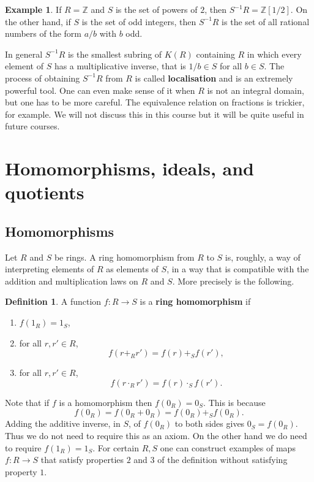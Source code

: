 \documentclass{article}
\newcommand{\Z}{\mathbb{Z}}
\newcommand{\rb}[1]{\left( #1 \right)}
\renewcommand{\sb}[1]{\left[ #1 \right]}
\theoremstyle{definition}\newtheorem{definition}{Definition}[subsection]
\theoremstyle{definition}\newtheorem{remark}[definition]{Remark}
\theoremstyle{definition}\newtheorem*{example}{Example}
\theoremstyle{definition}\newtheorem*{note}{Note}
\begin{document}
\begin{example}
If $ R = \Z $ and $ S $ is the set of powers of $ 2 $, then $ S^{-1}R = \Z\sb{1 / 2} $. On the other hand, if $ S $ is the set of odd integers, then $ S^{-1}R $ is the set of all rational numbers of the form $ a / b $ with $ b $ odd.
\end{example}

In general $ S^{-1}R $ is the smallest subring of $ K\rb{R} $ containing $ R $ in which every element of $ S $ has a multiplicative inverse, that is $ 1 / b \in S $ for all $ b \in S $. The process of obtaining $ S^{-1}R $ from $ R $ is called \textbf{localisation} and is an extremely powerful tool. One can even make sense of it when $ R $ is not an integral domain, but one has to be more careful. The equivalence relation on fractions is trickier, for example. We will not discuss this in this course but it will be quite useful in future courses.

\pagebreak

\section{Homomorphisms, ideals, and quotients}

\subsection{Homomorphisms}

Let $ R $ and $ S $ be rings. A ring homomorphism from $ R $ to $ S $ is, roughly, a way of interpreting elements of $ R $ as elements of $ S $, in a way that is compatible with the addition and multiplication laws on $ R $ and $ S $. More precisely is the following.

\begin{definition}
A function $ f : R \to S $ is a \textbf{ring homomorphism} if
\begin{enumerate}
\item $ f\rb{1_R} = 1_S $,
\item for all $ r, r' \in R $,
$$ f\rb{r +_R r'} = f\rb{r} +_S f\rb{r'}, $$
\item for all $ r, r' \in R $,
$$ f\rb{r \cdot_R r'} = f\rb{r} \cdot_S f\rb{r'}. $$
\end{enumerate}
\end{definition}

Note that if $ f $ is a homomorphism then $ f\rb{0_R} = 0_S $. This is because
$$ f\rb{0_R} = f\rb{0_R + 0_R} = f\rb{0_R} +_S f\rb{0_R}. $$
Adding the additive inverse, in $ S $, of $ f\rb{0_R} $ to both sides gives $ 0_S = f\rb{0_R} $. Thus we do not need to require this as an axiom. On the other hand we do need to require $ f\rb{1_R} = 1_S $. For certain $ R, S $ one can construct examples of maps $ f : R \to S $ that satisfy properties $ 2 $ and $ 3 $ of the definition without satisfying property $ 1 $.
\end{document}
